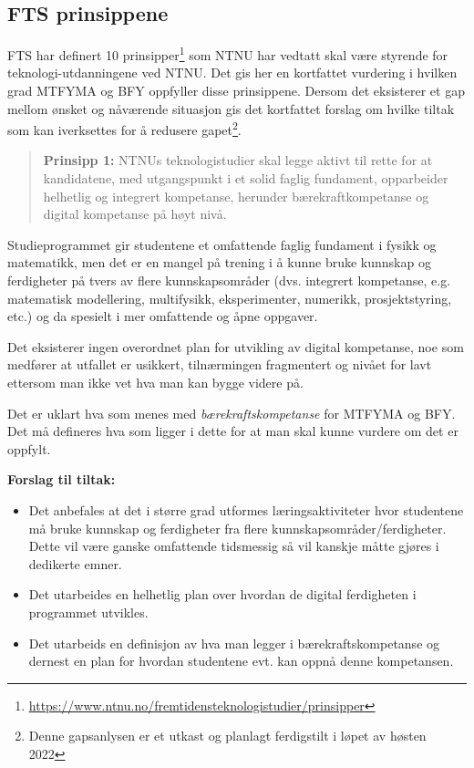 \subsection{FTS prinsippene}

FTS har definert 10 prinsipper\footnote{\url{https://www.ntnu.no/fremtidensteknologistudier/prinsipper}} som NTNU har vedtatt skal være styrende for teknologi-utdanningene ved NTNU. Det gis her en kortfattet vurdering i hvilken grad MTFYMA og BFY oppfyller disse prinsippene. Dersom det eksisterer et gap mellom ønsket og nåværende situasjon gis det kortfattet forslag om hvilke tiltak som kan iverksettes for å redusere gapet\footnote{Denne gapsanlysen er et utkast og planlagt ferdigstilt i løpet av høsten 2022}.

\begin{quote}
	\textbf{Prinsipp 1:} NTNUs teknologistudier skal legge aktivt til rette for at kandidatene, med utgangspunkt i et solid faglig fundament, opparbeider helhetlig og integrert kompetanse, herunder bærekraftkompetanse og digital kompetanse på høyt nivå.
\end{quote}

Studieprogrammet gir studentene et omfattende faglig fundament i fysikk og matematikk, men det er en mangel på trening i å kunne bruke kunnskap og ferdigheter på tvers av flere kunnskapsområder (dvs. integrert kompetanse, e.g. matematisk modellering, multifysikk, eksperimenter, numerikk, prosjektstyring, etc.) og da spesielt i mer omfattende og åpne oppgaver.

Det eksisterer ingen overordnet plan for utvikling av digital kompetanse, noe som medfører at utfallet er usikkert, tilnærmingen fragmentert og nivået for lavt ettersom man ikke vet hva man kan bygge videre på.

Det er uklart hva som menes med \emph{bærekraftskompetanse} for MTFYMA og BFY. Det må defineres hva som ligger i dette for at man skal kunne vurdere om det er oppfylt.

\textbf{Forslag til tiltak:}
\begin{itemize}
	\item Det anbefales at det i større grad utformes læringsaktiviteter hvor studentene må bruke kunnskap og ferdigheter fra flere kunnskapsområder/ferdigheter. Dette vil være ganske omfattende tidsmessig så vil kanskje måtte gjøres i dedikerte emner.
	\item Det utarbeides en helhetlig plan over hvordan de digital ferdigheten i programmet utvikles.
	\item Det utarbeids en definisjon av hva man legger i bærekraftskompetanse og dernest en plan for hvordan studentene evt. kan oppnå denne kompetansen.
\end{itemize}

